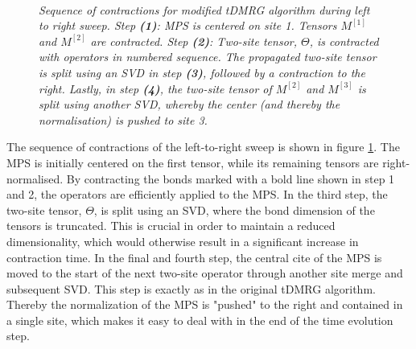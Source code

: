 \begin{figure}[h!]
\centering %
\begin{subfigure}[b]{0.4\textwidth}
	\caption{}  
  	
\end{subfigure}
\hspace{10mm}
\begin{subfigure}[b]{0.4\textwidth}
	\caption{}    
  	
\end{subfigure}
\\ %
\vspace{5mm}
\begin{subfigure}[b]{0.4\textwidth}
	\caption{}    	
  	
\end{subfigure}
\hspace{10mm}
\begin{subfigure}[b]{0.4\textwidth}
	\caption{}  
  	
\end{subfigure}
\caption{\textit{Sequence of contractions for modified tDMRG algorithm during left to right sweep. Step \textbf{(1)}: MPS is centered on site 1. Tensors $M^{[1]}$ and $M^{[2]}$ are contracted. Step \textbf{(2)}: Two-site tensor, $\Theta$, is contracted with operators in numbered sequence. The propagated two-site tensor is split using an SVD in step \textbf{(3)}, followed by a contraction to the right. Lastly, in step \textbf{(4)}, the two-site tensor of $M^{[2]}$ and $M^{[3]}$ is split using another SVD, whereby the center (and thereby the normalisation) is pushed to site 3.}}
\label{fig:TEBDContraction}
\end{figure}
The sequence of contractions of the left-to-right sweep is shown in figure \ref{fig:TEBDContraction}. The MPS is initially centered on the first tensor, while its remaining tensors are right-normalised. By contracting the bonds marked with a bold line shown in step 1 and 2, the operators are efficiently applied to the MPS. In the third step, the two-site tensor, $\Theta$, is split using an SVD, where the bond dimension of the tensors is truncated. This is crucial in order to maintain a reduced dimensionality, which would otherwise result in a significant increase in contraction time. In the final and fourth step, the central cite of the MPS is moved to the start of the next two-site operator through another site merge and subsequent SVD. This step is exactly as in the original tDMRG algorithm. Thereby the normalization of the MPS is "pushed" to the right and contained in a single site, which makes it easy to deal with in the end of the time evolution step.\\
